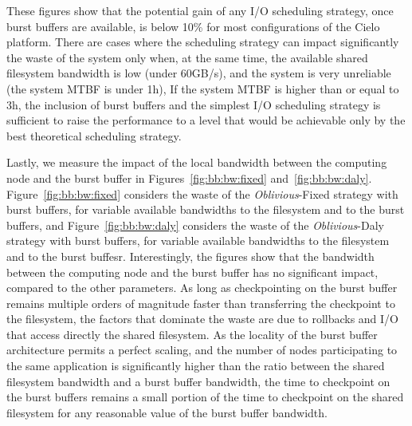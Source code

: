 \documentclass[two]{article}
\newcommand{\nocoop}{\emph{Oblivious}\xspace}
\def\propfixed{\nocoop-Fixed\xspace}
\def\propdaly{\nocoop-Daly\xspace}
\begin{document}
These figures show that the potential gain of any I/O scheduling
strategy, once burst buffers are available, is below 10\% for most
configurations of the Cielo platform. There are
cases where the scheduling strategy can impact significantly the waste
of the system only when, at the same time, the
available shared filesystem bandwidth is low (under 60GB/s), and the
system is very unreliable (the system MTBF is under 1h), 
If the system MTBF is higher than or equal to 3h, the inclusion
of burst buffers and the simplest I/O scheduling strategy is
sufficient to raise the performance to a level that would be achievable 
only by the
best theoretical scheduling strategy.

Lastly, we measure the impact of the local bandwidth between the
computing node and the burst buffer in Figures~\ref{fig:bb:bw:fixed}
and~\ref{fig:bb:bw:daly}. Figure~\ref{fig:bb:bw:fixed} considers the
waste of the \propfixed strategy with burst buffers, for variable
available bandwidths to the filesystem and to the burst
buffers, and Figure~\ref{fig:bb:bw:daly} considers the waste of the
\propdaly strategy with burst buffers,  for variable available bandwidths
to the filesystem and to the burst buffesr. Interestingly, the figures
show that the bandwidth between the computing node and the burst
buffer has no significant impact, compared to the other parameters. As
long as checkpointing on the burst buffer remains multiple orders of
magnitude faster than transferring the checkpoint to the filesystem,
the factors that dominate the waste are due to rollbacks and I/O
that access directly the shared filesystem. As the locality of the burst
buffer architecture permits a perfect scaling, and the number of nodes
participating to the same application is significantly higher than the
ratio between the shared filesystem bandwidth and a burst buffer
bandwidth, the time to checkpoint on the burst buffers remains
a small portion of the time to checkpoint on the shared filesystem for
any reasonable value of the burst buffer bandwidth.
\end{document}
